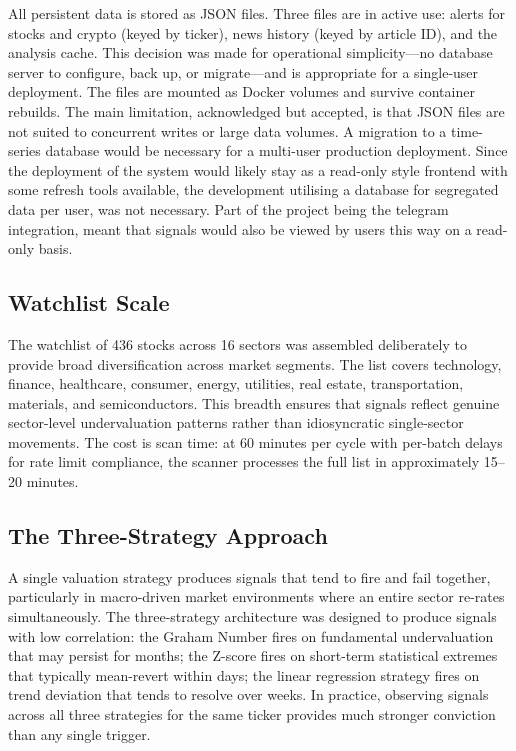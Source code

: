 \documentclass[12pt,a4paper]{article}
\begin{document}
All persistent data is stored as JSON files. Three files are in active use: alerts for stocks and crypto (keyed by ticker), news history (keyed by article ID), and the analysis cache. This decision was made for operational simplicity---no database server to configure, back up, or migrate---and is appropriate for a single-user deployment. The files are mounted as Docker volumes and survive container rebuilds. The main limitation, acknowledged but accepted, is that JSON files are not suited to concurrent writes or large data volumes. A migration to a time-series database would be necessary for a multi-user production deployment. Since the deployment of the system would likely stay as a read-only style frontend with some refresh tools available, the development utilising a database for segregated data per user, was not necessary. Part of the project being the telegram integration, meant that signals would also be viewed by users this way on a read-only basis.

\subsection{Watchlist Scale}

The watchlist of 436 stocks across 16 sectors was assembled deliberately to provide broad diversification across market segments. The list covers technology, finance, healthcare, consumer, energy, utilities, real estate, transportation, materials, and semiconductors. This breadth ensures that signals reflect genuine sector-level undervaluation patterns rather than idiosyncratic single-sector movements. The cost is scan time: at 60 minutes per cycle with per-batch delays for rate limit compliance, the scanner processes the full list in approximately 15--20 minutes.

\subsection{The Three-Strategy Approach}

A single valuation strategy produces signals that tend to fire and fail together, particularly in macro-driven market environments where an entire sector re-rates simultaneously. The three-strategy architecture was designed to produce signals with low correlation: the Graham Number fires on fundamental undervaluation that may persist for months; the Z-score fires on short-term statistical extremes that typically mean-revert within days; the linear regression strategy fires on trend deviation that tends to resolve over weeks. In practice, observing signals across all three strategies for the same ticker provides much stronger conviction than any single trigger.
\end{document}
